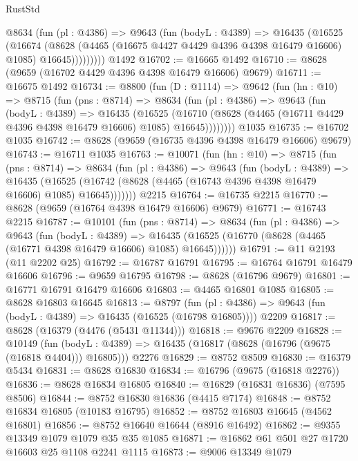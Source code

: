 \begin{lexlean}{RustStd}
\begin{coremodule}
          @8634
            (fun (pl : @4386) =>
            @9643
              (fun (bodyL : @4389) =>
              @16435
                (@16525
                  (@16674
                    (@8628
                      (@4465 (@16675 @4427 @4429 @4396 @4398 @16479 @16606) @1085)
                      @16645)))))))))
    @1492
@16702 := @16665 @1492
@16710 := @8628 (@9659 (@16702 @4429 @4396 @4398 @16479 @16606) @9679)
@16711 := @16675 @1492
@16734 := @8800
    (fun (D : @1114) =>
    @9642
      (fun (hn : @10) =>
      @8715
        (fun (pns : @8714) =>
        @8634
          (fun (pl : @4386) =>
          @9643
            (fun (bodyL : @4389) =>
            @16435
              (@16525
                (@16710 (@8628 (@4465 (@16711 @4429 @4396 @4398 @16479 @16606) @1085) @16645))))))))
    @1035
@16735 := @16702 @1035
@16742 := @8628 (@9659 (@16735 @4396 @4398 @16479 @16606) @9679)
@16743 := @16711 @1035
@16763 := @10071
    (fun (hn : @10) =>
    @8715
      (fun (pns : @8714) =>
      @8634
        (fun (pl : @4386) =>
        @9643
          (fun (bodyL : @4389) =>
          @16435
            (@16525 (@16742 (@8628 (@4465 (@16743 @4396 @4398 @16479 @16606) @1085) @16645)))))))
    @2215
@16764 := @16735 @2215
@16770 := @8628 (@9659 (@16764 @4398 @16479 @16606) @9679)
@16771 := @16743 @2215
@16787 := @10101
    (fun (pns : @8714) =>
    @8634
      (fun (pl : @4386) =>
      @9643
        (fun (bodyL : @4389) =>
        @16435 (@16525 (@16770 (@8628 (@4465 (@16771 @4398 @16479 @16606) @1085) @16645))))))
@16791 := @11 @2193 (@11 @2202 @25)
@16792 := @16787 @16791
@16795 := @16764 @16791 @16479 @16606
@16796 := @9659 @16795
@16798 := @8628 (@16796 @9679)
@16801 := @16771 @16791 @16479 @16606
@16803 := @4465 @16801 @1085
@16805 := @8628 @16803 @16645
@16813 := @8797
    (fun (pl : @4386) => @9643 (fun (bodyL : @4389) => @16435 (@16525 (@16798 @16805))))
    @2209
@16817 := @8628 (@16379 (@4476 (@5431 @11344)))
@16818 := @9676 @2209
@16828 := @10149
    (fun (bodyL : @4389) => @16435 (@16817 (@8628 (@16796 (@9675 (@16818 @4404))) @16805)))
    @2276
@16829 := @8752 @8509
@16830 := @16379 @5434
@16831 := @8628 @16830
@16834 := @16796 (@9675 (@16818 @2276))
@16836 := @8628 @16834 @16805
@16840 := @16829 (@16831 @16836) (@7595 @8506)
@16844 := @8752 @16830 @16836 (@4415 @7174)
@16848 := @8752 @16834 @16805 (@10183 @16795)
@16852 := @8752 @16803 @16645 (@4562 @16801)
@16856 := @8752 @16640 @16644 (@8916 @16492)
@16862 := @9355 @13349 @1079 @1079 @35 @35 @1085
@16871 := @16862 @61 @501 @27 @1720 @16603 @25 @1108 @2241 @1115
@16873 := @9006 @13349 @1079

\end{coremodule}
\end{lexlean}

